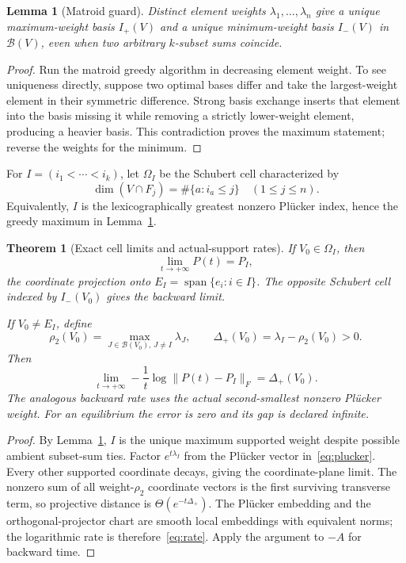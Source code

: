 \documentclass[10pt]{article}
\newtheorem{theorem}{Theorem}
\newtheorem{lemma}{Lemma}
\newcommand{\Span}{\operatorname{span}}
\begin{document}
\begin{lemma}[Matroid guard]\label{lem:greedy}
Distinct element weights $\lambda_1,\ldots,\lambda_n$ give a unique
maximum-weight basis $I_+(V)$ and a unique minimum-weight basis $I_-(V)$ in
$\mathcal B(V)$, even when two arbitrary $k$-subset sums coincide.
\end{lemma}
\begin{proof}
Run the matroid greedy algorithm in decreasing element weight.  To see
uniqueness directly, suppose two optimal bases differ and take the
largest-weight element in their symmetric difference.  Strong basis exchange
inserts that element into the basis missing it while removing a strictly
lower-weight element, producing a heavier basis.  This contradiction proves
the maximum statement; reverse the weights for the minimum.
\end{proof}

For $I=(i_1<\cdots<i_k)$, let $\Omega_I$ be the Schubert cell characterized by
\begin{equation}\label{eq:schubert}
 \dim(V\cap F_j)=\#\{a:i_a\le j\}\quad(1\le j\le n).
\end{equation}
Equivalently, $I$ is the lexicographically greatest nonzero Pl\"ucker index,
hence the greedy maximum in Lemma~\ref{lem:greedy}.

\begin{theorem}[Exact cell limits and actual-support rates]\label{thm:cells}
If $V_0\in\Omega_I$, then
\[
 \lim_{t\to+\infty}P(t)=P_I,
\]
the coordinate projection onto $E_I=\Span\{e_i:i\in I\}$.  The opposite
Schubert cell indexed by $I_-(V_0)$ gives the backward limit.

If $V_0\ne E_I$, define
\begin{equation}\label{eq:gap}
 \rho_2(V_0)=\max_{J\in\mathcal B(V_0),\,J\ne I}\lambda_J,
 \qquad \Delta_+(V_0)=\lambda_I-\rho_2(V_0)>0.
\end{equation}
Then
\begin{equation}\label{eq:rate}
 \lim_{t\to+\infty}-\frac1t
 \log\lVert P(t)-P_I\rVert_F=\Delta_+(V_0).
\end{equation}
The analogous backward rate uses the actual second-smallest nonzero
Pl\"ucker weight.  For an equilibrium the error is zero and its gap is
declared infinite.
\end{theorem}
\begin{proof}
By Lemma~\ref{lem:greedy}, $I$ is the unique maximum supported weight despite
possible ambient subset-sum ties.  Factor $e^{t\lambda_I}$ from the Pl\"ucker
vector in~\eqref{eq:plucker}.  Every other supported coordinate decays, giving
the coordinate-plane limit.  The nonzero sum of all weight-$\rho_2$ coordinate
vectors is the first surviving transverse term, so projective distance is
$\Theta(e^{-t\Delta_+})$.  The Pl\"ucker embedding and the orthogonal-projector
chart are smooth local embeddings with equivalent norms; the logarithmic
rate is therefore~\eqref{eq:rate}.  Apply the argument to $-A$ for backward
time.
\end{proof}
\end{document}
